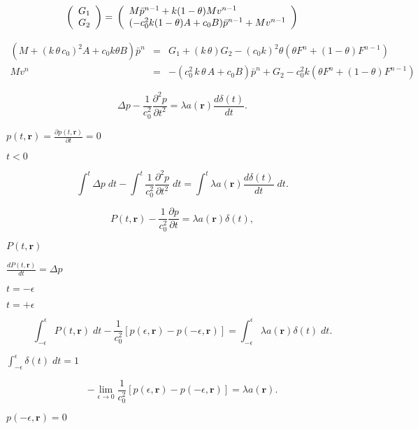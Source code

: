 \documentclass{article}
\begin{document}
\[ \left(\begin{array}{c} G_1 \\ G_2 \\ \end{array} \right)=\\ \left(\begin{array}{l} M\bar{p}^{n-1}+k(1-\theta)Mv^{n-1}\\ (-c_{0}^{2}k (1-\theta)A+c_0 B)\bar{p}^{n-1} +Mv^{n-1} \end{array}\right) \]
\pagebreak

\begin{eqnarray*} (M+(k\,\theta\,c_{0})^{2}A+c_0k\theta B)\bar{p}^{n} & = & G_{1}+(k\, \theta)G_{2}-(c_0k)^2\theta (\theta F^{n}+(1-\theta)F^{n-1}) \\ Mv^n & = & -(c_0^2\,k\, \theta\, A+c_0B)\bar{p}^{n}+ G_2 - c_0^2k(\theta F^{n}+(1-\theta)F^{n-1}) \end{eqnarray*}
\pagebreak

\[ \Delta p-\frac{1}{c_0^2} \frac{\partial^2 p}{\partial t^2} = \lambda a(\mathbf r)\frac{d\delta(t)}{dt}. \]
\pagebreak

$p(t,\mathbf r)=\frac{\partial p(t,\mathbf r)}{\partial t}=0$
\pagebreak

$t<0$
\pagebreak

\[ \int^t \Delta p\; dt -\int^t \frac{1}{c_0^2} \frac{\partial^2 p}{\partial t^2} \; dt = \int^t \lambda a(\mathbf r)\frac{d\delta(t)}{dt} \;dt. \]
\pagebreak

\[ P(t,\mathbf r) - \frac{1}{c_0^2} \frac{\partial p}{\partial t} = \lambda a(\mathbf r) \delta(t), \]
\pagebreak

$P(t,\mathbf r)$
\pagebreak

$\frac{dP(t,\mathbf r)}{dt}=\Delta p$
\pagebreak

$t=-\epsilon$
\pagebreak

$t=+\epsilon$
\pagebreak

\[ \int_{-\epsilon}^{\epsilon} P(t,\mathbf r)\; dt - \frac{1}{c_0^2} \left[ p(\epsilon,\mathbf r) - p(-\epsilon,\mathbf r) \right] = \int_{-\epsilon}^{\epsilon} \lambda a(\mathbf r) \delta(t) \; dt. \]
\pagebreak

$\int_{-\epsilon}^{\epsilon} \delta(t)\; dt = 1$
\pagebreak

\[ - \lim_{\epsilon\rightarrow 0}\frac{1}{c_0^2} \left[ p(\epsilon,\mathbf r) - p(-\epsilon,\mathbf r) \right] = \lambda a(\mathbf r). \]
\pagebreak

$p(-\epsilon,\mathbf r)=0$
\pagebreak
\end{document}
